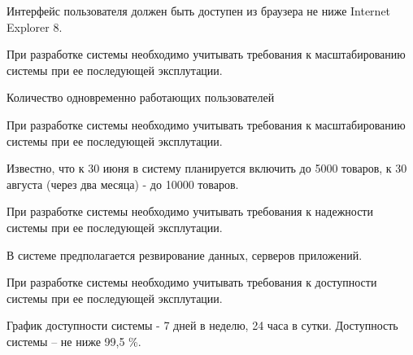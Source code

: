 

Интерфейс пользователя должен быть доступен из браузера не ниже Internet Explorer 8.


При разработке системы необходимо учитывать требования к масштабированию системы при ее последующей эксплутации. 

Количество одновременно работающих пользователей



При разработке системы необходимо учитывать требования к масштабированию системы при ее последующей эксплутации. 

Известно, что к 30 июня в систему планируется включить до 5000 товаров, к 30 августа (через два месяца) - до 10000 товаров. 


При разработке системы необходимо учитывать требования к надежности системы при ее последующей эксплутации. 

В системе предполагается резвирование данных, серверов приложений. 


При разработке системы необходимо учитывать требования к доступности системы при ее последующей эксплутации. 

График доступности системы - 7 дней в неделю, 24 часа в сутки. 
Доступность системы -- не ниже 99,5 \%. 

